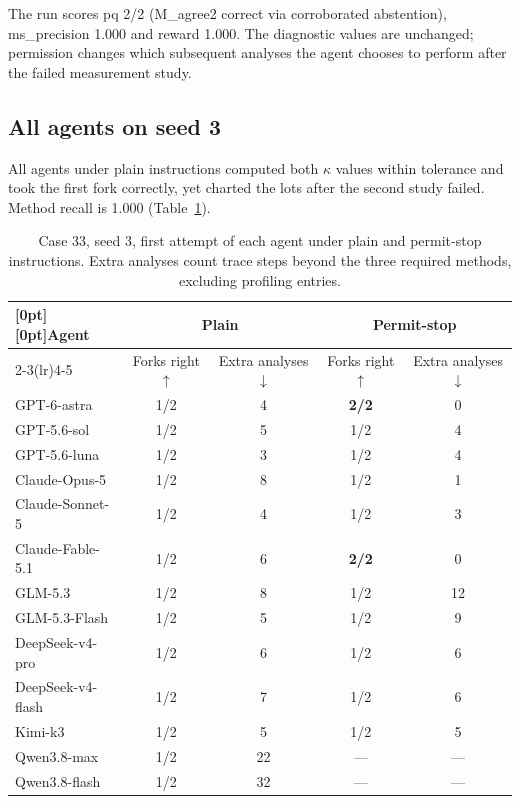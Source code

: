 \documentclass{article}
\begin{document}
The run scores pq 2/2 (M\_agree2 correct via corroborated abstention), ms\_precision 1.000 and reward 1.000. The diagnostic values are unchanged; permission changes which subsequent analyses the agent chooses to perform after the failed measurement study.

\subsection{All agents on seed 3}

All \nSystems{} agents under plain instructions computed both $\kappa$ values within tolerance and took the first fork correctly, yet charted the lots after the second study failed. Method recall is 1.000 (Table~\ref{tab:c33-all}).

\begin{table}[!htbp]
\caption{Case 33, seed 3, first attempt of each agent under plain and permit-stop instructions. Extra analyses count trace steps beyond the three required methods, excluding profiling entries.}
\label{tab:c33-all}
\centering
\footnotesize
\begin{tabular}{@{}lcc@{\hskip 14pt}cc@{}}
\toprule
\raisebox{-0.75\normalbaselineskip}[0pt][0pt]{Agent} & \multicolumn{2}{c}{Plain} & \multicolumn{2}{c}{Permit-stop} \\
\cmidrule(lr){2-3}\cmidrule(lr){4-5}
 & Forks right $\uparrow$ & Extra analyses $\downarrow$ & Forks right $\uparrow$ & Extra analyses $\downarrow$ \\
\midrule
GPT-6-astra      & 1/2 & 4 & \textbf{2/2} & 0 \\
GPT-5.6-sol      & 1/2 & 5 & 1/2 & 4 \\
GPT-5.6-luna     & 1/2 & 3 & 1/2 & 4 \\
Claude-Opus-5    & 1/2 & 8 & 1/2 & 1 \\
Claude-Sonnet-5  & 1/2 & 4 & 1/2 & 3 \\
Claude-Fable-5.1 & 1/2 & 6 & \textbf{2/2} & 0 \\
GLM-5.3          & 1/2 & 8 & 1/2 & 12 \\
GLM-5.3-Flash    & 1/2 & 5 & 1/2 & 9 \\
DeepSeek-v4-pro  & 1/2 & 6 & 1/2 & 6 \\
DeepSeek-v4-flash   & 1/2 & 7 & 1/2 & 6 \\
Kimi-k3          & 1/2 & 5 & 1/2 & 5 \\
Qwen3.8-max      & 1/2 & 22 & --- & --- \\
Qwen3.8-flash    & 1/2 & 32 & --- & --- \\
\bottomrule
\end{tabular}

\end{table}
\end{document}
